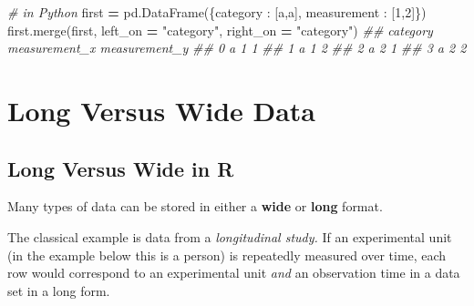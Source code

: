 \documentclass[
  12pt,
  krantz2]{krantz}
\makeatletter
\newenvironment{Shaded}{\begin{snugshade}}{\end{snugshade}}
\newcommand{\CommentTok}[1]{\textcolor[rgb]{0.37,0.37,0.37}{\textit{#1}}}
\newcommand{\DecValTok}[1]{\textcolor[rgb]{0.06,0.06,0.06}{#1}}
\newcommand{\NormalTok}[1]{#1}
\newcommand{\OperatorTok}[1]{\textcolor[rgb]{0.43,0.43,0.43}{\textbf{#1}}}
\newcommand{\StringTok}[1]{\textcolor[rgb]{0.5,0.5,0.5}{#1}}
\newenvironment{kframe}{%
\medskip{}
\setlength{\fboxsep}{.8em}
 \def\at@end@of@kframe{}%
 \ifinner\ifhmode%
  \def\at@end@of@kframe{\end{minipage}}%
  \begin{minipage}{\columnwidth}%
 \fi\fi%
 \def\FrameCommand##1{\hskip\@totalleftmargin \hskip-\fboxsep
 \colorbox{shadecolor}{##1}\hskip-\fboxsep
     \hskip-\linewidth \hskip-\@totalleftmargin \hskip\columnwidth}%
 \MakeFramed {\advance\hsize-\width
   \@totalleftmargin\z@ \linewidth\hsize
   \@setminipage}}%
 {\par\unskip\endMakeFramed%
 \at@end@of@kframe}
\renewenvironment{Shaded}{\begin{kframe}}{\end{kframe}}
\makeatother
\begin{document}
\begin{Shaded}
\begin{Highlighting}[]
\CommentTok{\# in Python}
\NormalTok{first }\OperatorTok{=}\NormalTok{ pd.DataFrame(\{}\StringTok{\textquotesingle{}category\textquotesingle{}}\NormalTok{ : [}\StringTok{\textquotesingle{}a\textquotesingle{}}\NormalTok{,}\StringTok{\textquotesingle{}a\textquotesingle{}}\NormalTok{], }\StringTok{\textquotesingle{}measurement\textquotesingle{}}\NormalTok{ : [}\DecValTok{1}\NormalTok{,}\DecValTok{2}\NormalTok{]\})}
\NormalTok{first.merge(first, left\_on }\OperatorTok{=} \StringTok{"category"}\NormalTok{, right\_on }\OperatorTok{=} \StringTok{"category"}\NormalTok{)}
\CommentTok{\#\#   category  measurement\_x  measurement\_y}
\CommentTok{\#\# 0        a              1              1}
\CommentTok{\#\# 1        a              1              2}
\CommentTok{\#\# 2        a              2              1}
\CommentTok{\#\# 3        a              2              2}
\end{Highlighting}
\end{Shaded}

\hypertarget{long-versus-wide-data}{%
\section{Long Versus Wide Data}\label{long-versus-wide-data}}

\hypertarget{long-versus-wide-in-r}{%
\subsection{Long Versus Wide in R}\label{long-versus-wide-in-r}}

Many types of data can be stored in either a \textbf{wide} or \textbf{long} format.

The classical example is data from a \emph{longitudinal study.} If an experimental unit (in the example below this is a person) is repeatedly measured over time, each row would correspond to an experimental unit \emph{and} an observation time in a data set in a long form.
\end{document}
